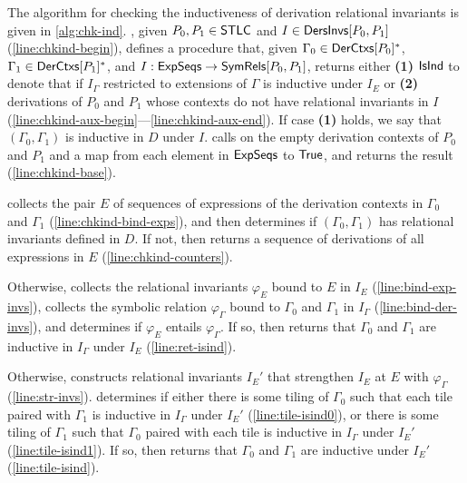 %
The algorithm \chkinductive for checking the inductiveness of
derivation relational invariants is given in
\autoref{alg:chk-ind}.
%
\chkinductive, given $P_0, P_1 \in \mathsf{STLC}$ and $I \in
\mathsf{DersInvs}[ P_0, P_1 ]$ (\autoref{line:chkind-begin}), defines a
procedure \chkindaux that, given $\Gamma_0 \in \mathsf{DerCtxs}[ P_0 ]^{*}$,
$\Gamma_1 \in \mathsf{DerCtxs}[ P_1 ]^{*}$, and $I: \mathsf{ExpSeqs} \to
\mathsf{SymRels}[ P_0, P_1 ]$, returns either %
\textbf{(1)} $\mathsf{IsInd}$ to denote that if $I_{\Gamma}$ restricted to
extensions of $\Gamma$ is inductive under $I_E$
%
%
or
%
%
\textbf{(2)} derivations of $P_0$ and $P_1$ whose contexts do not have
relational invariants in $I$
(\autoref{line:chkind-aux-begin}---\autoref{line:chkind-aux-end}).
%
If case \textbf{(1)} holds, we say that $(\Gamma_0, \Gamma_1)$ is
inductive in $D$ under $I$.
%
\chkinductive calls \chkindaux on the empty derivation contexts of
$P_0$ and $P_1$ and a map from each element in $\mathsf{ExpSeqs}$ to
$\mathsf{True}$, and returns the result (\autoref{line:chkind-base}).

\chkindaux collects the pair $E$ of sequences of expressions of the
derivation contexts in $\Gamma_0$ and $\Gamma_1$
(\autoref{line:chkind-bind-exps}), and then determines if $(\Gamma_0,
\Gamma_1)$ has relational invariants defined in $D$.
%
If not, then \chkindaux returns a sequence of derivations of all
expressions in $E$ (\autoref{line:chkind-counters}).

Otherwise, \chkindaux collects the relational invariants $\varphi_E$
bound to $E$ in $I_E$ (\autoref{line:bind-exp-invs}), %
collects the symbolic relation $\varphi_{\Gamma}$ bound to $\Gamma_0$
and $\Gamma_1$ in $I_{\Gamma}$ (\autoref{line:bind-der-invs}), and %
determines if $\varphi_E$ entails $\varphi_{\Gamma}$.
%
If so, then \chkindaux returns that $\Gamma_0$ and $\Gamma_1$ are
inductive in $I_{\Gamma}$ under $I_E$ (\autoref{line:ret-isind}).

Otherwise, \chkindaux constructs relational invariants $I_E'$ that
strengthen $I_E$ at $E$ with $\varphi_{\Gamma}$
(\autoref{line:str-invs}).
%
\chkindaux determines if either there is some tiling of $\Gamma_0$
such that each tile paired with $\Gamma_1$ is inductive in
$I_{\Gamma}$ under $I_E'$ (\autoref{line:tile-isind0}), or there is
some tiling of $\Gamma_1$ such that $\Gamma_0$ paired with each tile
is inductive in $I_{\Gamma}$ under $I_E'$ (\autoref{line:tile-isind1}).
%
If so, then \chkindaux returns that $\Gamma_0$ and $\Gamma_1$ are
inductive under $I_E'$ (\autoref{line:tile-isind}).


